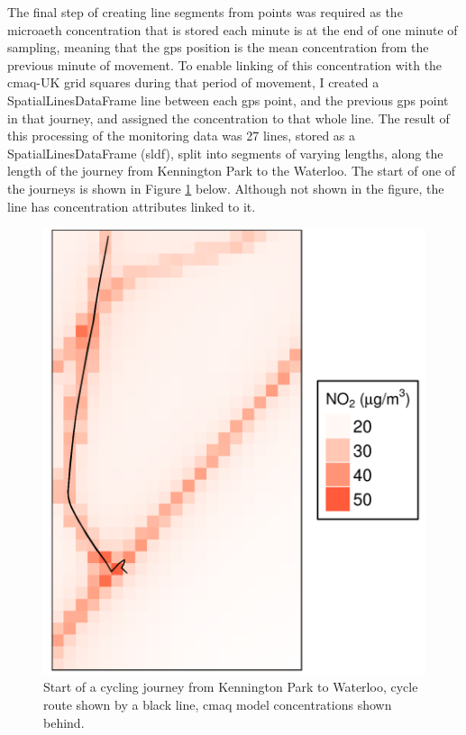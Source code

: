 The final  step of creating line segments from points was required as the microaeth concentration that is stored each minute is at the end of one minute of sampling, meaning that the \gls{gps} position is the mean concentration from the previous minute of movement. To enable linking of this concentration with the \gls{cmaq}-UK grid squares during that period of movement, I created a SpatialLinesDataFrame line between each \gls{gps} point, and the previous \gls{gps} point in that journey, and assigned the concentration to that whole line.
The result of this processing of the monitoring data was 27 lines, stored as a SpatialLinesDataFrame (\gls{sldf}), split into segments of varying lengths, along the length of the journey from Kennington Park to the Waterloo. The start of one of the journeys is shown in Figure \ref{fig:cmaq_cycle_route_zoomed} below. Although not shown in the figure, the line has concentration attributes linked to it.

\begin{figure}[H]
\centering
\includegraphics[scale=0.2]{images/cmaq_cycle_route_zoomed.png}
\caption{Start of a cycling journey from Kennington Park to Waterloo, cycle route shown by a black line, \gls{cmaq} model concentrations shown behind.}
\label{fig:cmaq_cycle_route_zoomed}
\end{figure}

